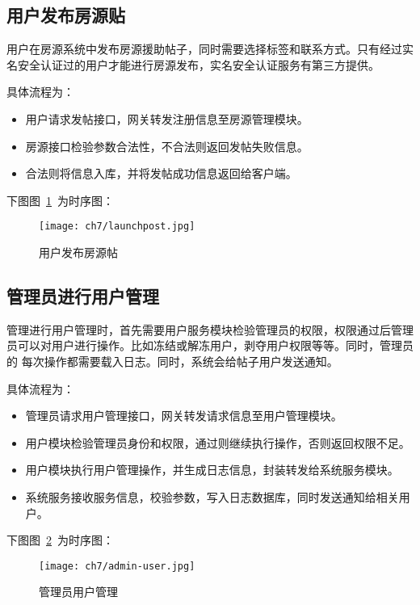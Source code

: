 \subsection{用户发布房源贴}
用户在房源系统中发布房源援助帖子，同时需要选择标签和联系方式。只有经过实名安全认证过的用户才能进行房源发布，实名安全认证服务有第三方提供。

具体流程为：
\begin{itemize}
    \item 用户请求发帖接口，网关转发注册信息至房源管理模块。
    \item 房源接口检验参数合法性，不合法则返回发帖失败信息。
    \item 合法则将信息入库，并将发帖成功信息返回给客户端。
\end{itemize}

下图图~\ref{fig:launchpost}~为时序图：
\begin{figure}[htbp]
    \centering
    \texttt{[image: ch7/launchpost.jpg]}
    \caption{用户发布房源帖}\label{fig:launchpost}
    \vspace{\baselineskip} %
\end{figure}

\subsection{管理员进行用户管理}
管理进行用户管理时，首先需要用户服务模块检验管理员的权限，权限通过后管理员可以对用户进行操作。比如冻结或解冻用户，剥夺用户权限等等。同时，管理员的
每次操作都需要载入日志。同时，系统会给帖子用户发送通知。

具体流程为：
\begin{itemize}
    \item 管理员请求用户管理接口，网关转发请求信息至用户管理模块。
    \item 用户模块检验管理员身份和权限，通过则继续执行操作，否则返回权限不足。
    \item 用户模块执行用户管理操作，并生成日志信息，封装转发给系统服务模块。
    \item 系统服务接收服务信息，校验参数，写入日志数据库，同时发送通知给相关用户。
\end{itemize}

下图图~\ref{fig:admin-user}~为时序图：
\begin{figure}[htbp]
    \centering
    \texttt{[image: ch7/admin-user.jpg]}
    \caption{管理员用户管理}\label{fig:admin-user}
    \vspace{\baselineskip} %
\end{figure}

